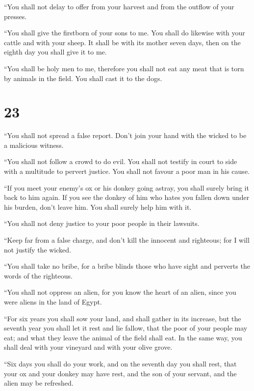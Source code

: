  ``You shall not delay to offer from your harvest and
from the outflow of your presses.

``You shall give the firstborn of your sons to me.  You
shall do likewise with your cattle and with your sheep. It shall be with
its mother seven days, then on the eighth day you shall give it to me.

 ``You shall be holy men to me, therefore you shall not
eat any meat that is torn by animals in the field. You shall cast it to
the dogs.

\hypertarget{section-22}{%
\section{23}\label{section-22}}

 ``You shall not spread a false report. Don't join your
hand with the wicked to be a malicious witness.

 ``You shall not follow a crowd to do evil. You shall not
testify in court to side with a multitude to pervert justice.
 You shall not favour a poor man in his cause.

 ``If you meet your enemy's ox or his donkey going astray,
you shall surely bring it back to him again.  If you see
the donkey of him who hates you fallen down under his burden, don't
leave him. You shall surely help him with it.

 ``You shall not deny justice to your poor people in their
lawsuits.

 ``Keep far from a false charge, and don't kill the
innocent and righteous; for I will not justify the wicked.

 ``You shall take no bribe, for a bribe blinds those who
have sight and perverts the words of the righteous.

 ``You shall not oppress an alien, for you know the heart
of an alien, since you were aliens in the land of Egypt.

 ``For six years you shall sow your land, and shall
gather in its increase,  but the seventh year you shall
let it rest and lie fallow, that the poor of your people may eat; and
what they leave the animal of the field shall eat. In the same way, you
shall deal with your vineyard and with your olive grove.

 ``Six days you shall do your work, and on the seventh
day you shall rest, that your ox and your donkey may have rest, and the
son of your servant, and the alien may be refreshed.

